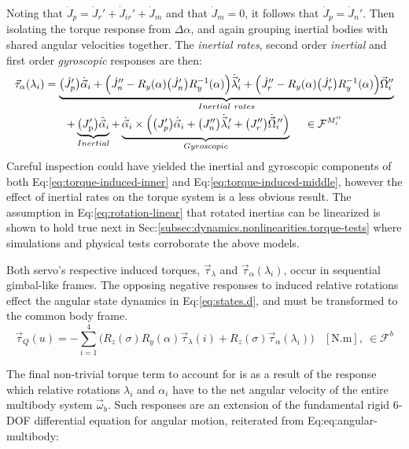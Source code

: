 Noting that $\dot{J}_p = \dot{J}_r'+\dot{J}_{ir}'+\dot{J}_m$ and that $\dot{J}_m=0$, it follows that $\dot{J}_p =\dot{J}_n'$. Then isolating the torque response from $\Delta\alpha$, and again grouping inertial bodies with shared angular velocities together. The \emph{inertial rates}, second order \emph{inertial} and first order \emph{gyroscopic} responses are then:
\begin{multline} \label{eq:torque-induced-middle}
\vec{\tau}_\alpha(\lambda_i)=\underbrace{\big(\dot{J}_p'\big)\dot{\vec{\alpha}}_i+\Big(\dot{J}_n''-R_y(\alpha)\big(\dot{J}_n'\big)R_y^{-1}(\alpha)\Big)\dot{\vec{\lambda}}_i'+\Big(\dot{J}_r''-R_y(\alpha)\big(\dot{J}_r'\big)R_y^{-1}(\alpha)\Big)\vec{\Omega}_i''}_{Inertial~rates}
\\
+\underbrace{\big(J_\text{p}'\big)\ddot{\vec{\alpha}}_i}_{Inertial}+\underbrace{\dot{\vec{\alpha}}_i\times \Big(\big(J_p'\big)\dot{\vec{\alpha}}_i+\big(J_n''\big)\dot{\vec{\lambda}}_i\hspace{-2pt}'+\big(J_r''\big)\dot{\vec{\Omega}}_i\hspace{-2pt}''\Big)}_{Gyroscopic}~~~~\in\mathcal{F}^{M_i''}
\end{multline}
Careful inspection could have yielded the inertial and gyroscopic components of both Eq:\ref{eq:torque-induced-inner} and Eq:\ref{eq:torque-induced-middle}, however the effect of inertial rates on the torque system is a less obvious result. The assumption in Eq:\ref{eq:rotation-linear} that rotated inertias can be linearized is shown to hold true next in Sec:\ref{subsec:dynamics.nonlinearities.torque-tests} where simulations and physical tests corroborate the above models.
\par
Both servo's respective induced torques, $\vec{\tau}_\lambda$ and $\vec{\tau}_\alpha(\lambda_i)$, occur in sequential gimbal-like frames. The opposing negative responses to induced relative rotations effect the angular state dynamics in Eq:\ref{eq:states.d}, and must be transformed to the common body frame.
\begin{equation}\label{eq:torque-response}
\vec{\tau}_Q(u)=-\sum_{i=1}^4 \Big(R_z(\sigma)R_y(\alpha)\vec{\tau}_{\lambda}(i)+R_z(\sigma)\vec{\tau}_{\alpha}(\lambda_i)\Big)~~~~[\text{N.m}],~\in\mathcal{F}^b
\end{equation}
\par
The final non-trivial torque term to account for is as a result of the response which relative rotations $\lambda_i$ and $\alpha_i$ have to the net angular velocity of the entire multibody system $\vec{\omega}_b$. Such responses are an extension of the fundamental rigid 6-DOF differential equation for angular motion, reiterated from Eq:{eq:angular-multibody}:
